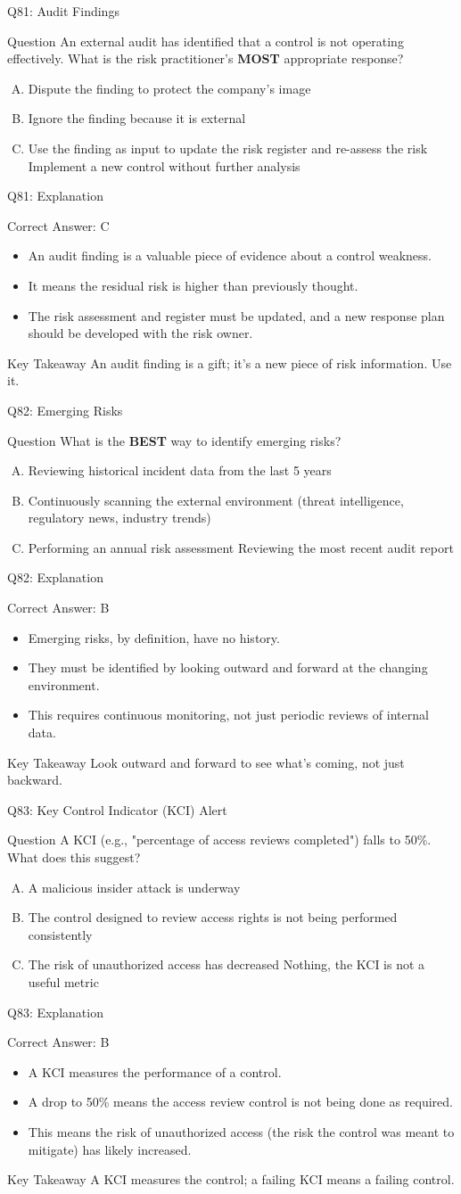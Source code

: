\documentclass[aspectratio=169]{beamer}
\newcommand{\hq}[7]{%
	\begin{frame}{Q#1: #2}
		\begin{block}{Question}
			#3
		\end{block}
		\begin{enumerate}[(A)]
			#4
		\end{enumerate}
	\end{frame}
	\begin{frame}{Q#1: Explanation}
		\begin{block}{Correct Answer: #5}
			\begin{itemize}
				#6
			\end{itemize}
		\end{block}
		\begin{alertblock}{Key Takeaway}
			#7
		\end{alertblock}
	\end{frame}
}
\begin{document}
{		\hq{81}{Audit Findings}
		{An external audit has identified that a control is not operating effectively. What is the risk practitioner's \textbf{MOST} appropriate response?}
		{\item Dispute the finding to protect the company's image
			\item Ignore the finding because it is external
			\item Use the finding as input to update the risk register and re-assess the risk
			\ditem Implement a new control without further analysis}
		{C}
		{\item An audit finding is a valuable piece of evidence about a control weakness.
			\item It means the residual risk is higher than previously thought.
			\item The risk assessment and register must be updated, and a new response plan should be developed with the risk owner.}
		{An audit finding is a gift; it's a new piece of risk information. Use it.}
		
		\hq{82}{Emerging Risks}
		{What is the \textbf{BEST} way to identify emerging risks?}
		{\item Reviewing historical incident data from the last 5 years
			\item Continuously scanning the external environment (threat intelligence, regulatory news, industry trends)
			\item Performing an annual risk assessment
			\ditem Reviewing the most recent audit report}
		{B}
		{\item Emerging risks, by definition, have no history.
			\item They must be identified by looking outward and forward at the changing environment.
			\item This requires continuous monitoring, not just periodic reviews of internal data.}
		{Look outward and forward to see what's coming, not just backward.}
		
		\hq{83}{Key Control Indicator (KCI) Alert}
		{A KCI (e.g., "percentage of access reviews completed") falls to 50\%. What does this suggest?}
		{\item A malicious insider attack is underway
			\item The control designed to review access rights is not being performed consistently
			\item The risk of unauthorized access has decreased
			\ditem Nothing, the KCI is not a useful metric}
		{B}
		{\item A KCI measures the performance of a control.
			\item A drop to 50\% means the access review control is not being done as required.
			\item This means the risk of unauthorized access (the risk the control was meant to mitigate) has likely increased.}
		{A KCI measures the control; a failing KCI means a failing control.}
		
}
\end{document}
